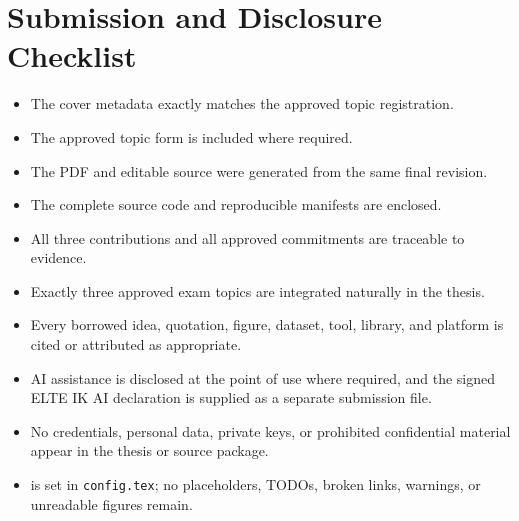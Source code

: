 \chapter{Submission and Disclosure Checklist}
\label{app:declarations}


\begin{itemize}
  \item The cover metadata exactly matches the approved topic registration.
  \item The approved topic form is included where required.
  \item The PDF and editable source were generated from the same final revision.
  \item The complete source code and reproducible manifests are enclosed.
  \item All three contributions and all approved commitments are traceable to evidence.
  \item Exactly three approved exam topics are integrated naturally in the thesis.
  \item Every borrowed idea, quotation, figure, dataset, tool, library, and platform is
        cited or attributed as appropriate.
  \item AI assistance is disclosed at the point of use where required, and the signed
        ELTE IK AI declaration is supplied as a separate submission file.
  \item No credentials, personal data, private keys, or prohibited confidential material
        appear in the thesis or source package.
  \item \texttt{\string\showtemplateguidancefalse} is set in \texttt{config.tex}; no
        placeholders, TODOs, broken links, warnings, or unreadable figures remain.
\end{itemize}
